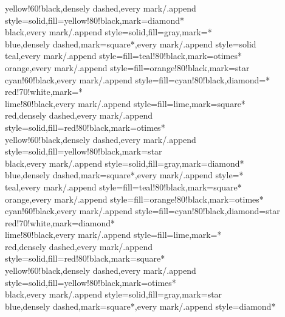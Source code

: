 {    yellow!60!black,densely dashed,every mark/.append style={solid,fill=yellow!80!black},mark=diamond*\\%
    black,every mark/.append style={solid,fill=gray},mark=*\\%
    blue,densely dashed,mark=square*,every mark/.append style=solid\\%
    teal,every mark/.append style={fill=teal!80!black},mark=otimes*\\%
    orange,every mark/.append style={fill=orange!80!black},mark=star\\%
    cyan!60!black,every mark/.append style={fill=cyan!80!black},diamond=*\\%
    red!70!white,mark=*\\%
    lime!80!black,every mark/.append style={fill=lime},mark=square*\\%
    red,densely dashed,every mark/.append style={solid,fill=red!80!black},mark=otimes*\\%
    yellow!60!black,densely dashed,every mark/.append style={solid,fill=yellow!80!black},mark=star\\%
    black,every mark/.append style={solid,fill=gray},mark=diamond*\\%
    blue,densely dashed,mark=square*,every mark/.append style=*\\%
    teal,every mark/.append style={fill=teal!80!black},mark=square*\\%
    orange,every mark/.append style={fill=orange!80!black},mark=otimes*\\%
    cyan!60!black,every mark/.append style={fill=cyan!80!black},diamond=star\\%
    red!70!white,mark=diamond*\\%
    lime!80!black,every mark/.append style={fill=lime},mark=*\\%
    red,densely dashed,every mark/.append style={solid,fill=red!80!black},mark=square*\\%
    yellow!60!black,densely dashed,every mark/.append style={solid,fill=yellow!80!black},mark=otimes*\\%
    black,every mark/.append style={solid,fill=gray},mark=star\\%
    blue,densely dashed,mark=square*,every mark/.append style=diamond*\\%
}
